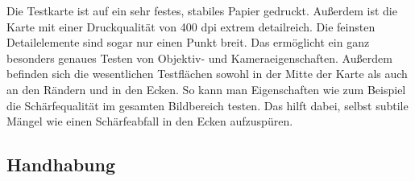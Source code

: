 Die Testkarte ist auf ein sehr festes, stabiles Papier gedruckt. Außerdem ist die Karte mit einer Druckqualität von 400 dpi extrem detailreich. Die feinsten Detailelemente sind sogar nur einen Punkt breit. Das ermöglicht ein ganz besonders genaues Testen von Objektiv- und Kameraeigenschaften. Außerdem befinden sich die wesentlichen Testflächen sowohl in der Mitte der Karte als auch an den Rändern und in den Ecken. So kann man Eigenschaften wie zum Beispiel die Schärfequalität im gesamten Bildbereich testen. Das hilft dabei, selbst subtile Mängel wie einen Schärfeabfall in den Ecken aufzuspüren.

\subsection{Handhabung}

